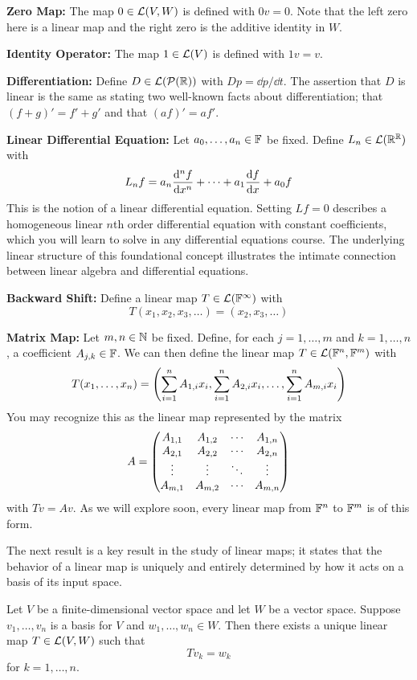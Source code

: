 \begin{example}
    \textbf{Zero Map:} The map $0 \in \mathcal{L}(V,W)$ is defined with $0v = 0$. Note that the left zero here is a linear map and the right zero is the additive identity in $W$.

    \textbf{Identity Operator:} The map $1\in\mathcal{L}(V)$ is defined with $1v = v$. 

    \textbf{Differentiation:} Define $D\in \mathcal{L}(\mathcal{P}(\mathbb{R}))$ with $Dp = \dd p/\dd t$. The assertion that $D$ is linear is the same as stating two well-known facts about differentiation; that $(f+g)' = f'+g'$ and that $(af)' = af'$.

    \textbf{Linear Differential Equation:} Let $a_0, \dots, a_n \in \mathbb F$ be fixed. Define $L_n \in \mathcal{L}(\mathbb{R}^{\mathbb{R}})$ with 
    \[ L_nf = a_n \dv[n]{f}{x} + \cdots + a_1\dv{f}{x} + a_0 f\]
    This is the notion of a linear differential equation. Setting $Lf = 0$ describes a homogeneous linear $n$th order differential equation with constant coefficients, which you will learn to solve in any differential equations course. The underlying linear structure of this foundational concept illustrates the intimate connection between linear algebra and differential equations.

    \textbf{Backward Shift:} Define a linear map $T\in \mathcal{L}(\mathbb F^\infty)$ with
    \[ T(x_1, x_2, x_3, \dots) = (x_2, x_3, \dots) \]

    \textbf{Matrix Map:} Let $m,n\in \mathbb{N}$ be fixed. Define, for each $j = 1, \dots, m$ and $k = 1, \dots, n$, a coefficient $A_{j,k}\in \mathbb F$. We can then define the linear map $T\in \mathcal{L}(\mathbb F^n, \mathbb F^m)$ with
    \[ T(x_1, \dots, x_n) = \pqty{\sum_{i=1}^n A_{1,i}x_i, \sum_{i=1}^n A_{2,i}x_i, \dots, \sum_{i=1}^n A_{m,i}x_i}\]
    You may recognize this as the linear map represented by the matrix
    \[ A = \begin{pmatrix}A_{1,1} & A_{1,2} & \cdots & A_{1,n} \\
                 A_{2,1} & A_{2,2} & \cdots & A_{2,n} \\
                 \vdots & \vdots & \ddots & \vdots \\
                 A_{m,1} & A_{m,2} & \cdots & A_{m,n}\end{pmatrix}\]
    with $Tv = Av$. As we will explore soon, every linear map from $\mathbb F^n$ to $\mathbb F^m$ is of this form.
\end{example}
The next result is a key result in the study of linear maps; it states that the behavior of a linear map is uniquely and entirely determined by how it acts on a basis of its input space. 
\begin{theorem}
    Let $V$ be a finite-dimensional vector space and let $W$ be a vector space. Suppose $v_1, \dots, v_n$ is a basis for $V$ and $w_1, \dots, w_n \in W$. Then there exists a unique linear map $T\in \mathcal{L}(V,W)$ such that
    \[ Tv_k = w_k\]
    for $k= 1, \dots, n$.
\end{theorem}
